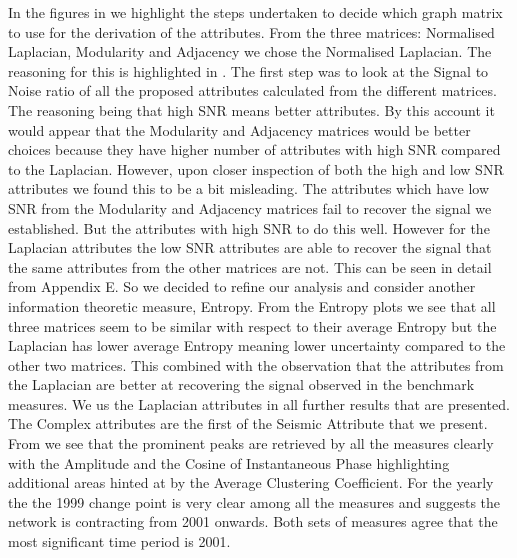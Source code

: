 In the figures in  we highlight the steps undertaken to decide which graph matrix to use for the derivation of the attributes. From the three matrices: Normalised Laplacian, Modularity and Adjacency we chose the Normalised Laplacian. The reasoning for this is highlighted in . The first step was to look at the Signal to Noise ratio of all the proposed attributes calculated from the different matrices. The reasoning being that high SNR means better attributes. By this account it would appear that the Modularity and Adjacency matrices would be better choices because they have higher number of attributes with high SNR compared to the Laplacian. However, upon closer inspection of both the high and low SNR attributes we found this to be a bit misleading. The attributes which have low SNR from the Modularity and Adjacency matrices fail to recover the signal we established. But the attributes with high SNR to do this well. However for the Laplacian attributes the low SNR attributes are able to recover the signal that the same attributes from the other matrices are not. This can be seen in detail from Appendix E. So we decided to refine our analysis and consider another information theoretic measure, Entropy. From the Entropy plots we see that all three matrices seem to be similar with respect to their average Entropy but the Laplacian has lower average Entropy meaning lower uncertainty compared to the other two matrices. This combined with the observation that the attributes from the Laplacian are better at recovering the signal observed in the benchmark measures. We us the Laplacian attributes in all further results that are presented. \\

The Complex attributes are the first of the Seismic Attribute that we present. From  we see that the prominent peaks are retrieved by all the measures clearly with the Amplitude and the Cosine of Instantaneous Phase highlighting additional areas hinted at by the Average Clustering Coefficient. For the yearly the the 1999 change point is very clear among all the measures and suggests the network is contracting from 2001 onwards. Both sets of measures agree that the most significant time period is 2001.  \\

